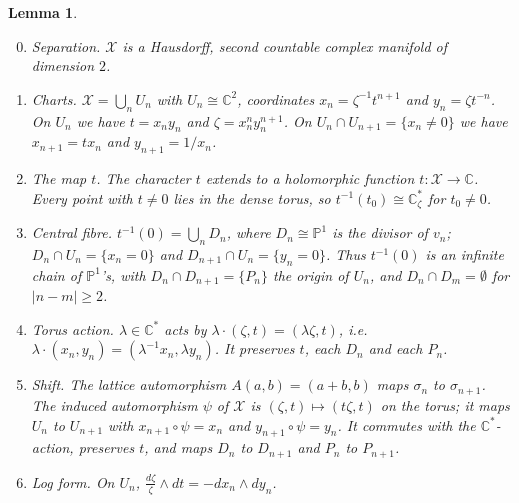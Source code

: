 \documentclass{article}
\newtheorem{lemma}[theorem]{Lemma}
\theoremstyle{definition}
\theoremstyle{plain}
\newcommand{\C}{\mathbb{C}}
\newcommand{\PP}{\mathbb{P}}
\newcommand{\cX}{\mathcal{X}}
\begin{document}
\begin{lemma}\label{lem:toric}\leavevmode
\begin{enumerate}
\setcounter{enumi}{-1}
\item \emph{Separation.} $\cX$ is a Hausdorff, second countable complex manifold of
  dimension $2$.
\item \emph{Charts.} $\cX=\bigcup_n U_n$ with $U_n\cong\C^2$, coordinates
  $x_n=\zeta^{-1}t^{n+1}$ and $y_n=\zeta t^{-n}$. On $U_n$ we have $t=x_ny_n$ and
  $\zeta=x_n^ny_n^{n+1}$. On $U_n\cap U_{n+1}=\{x_n\neq0\}$ we have $x_{n+1}=tx_n$ and
  $y_{n+1}=1/x_n$.
\item \emph{The map $t$.} The character $t$ extends to a holomorphic function
  $t\colon\cX\to\C$. Every point with $t\neq0$ lies in the dense torus, so
  $t^{-1}(t_0)\cong\C^*_\zeta$ for $t_0\ne0$.
\item \emph{Central fibre.} $t^{-1}(0)=\bigcup_n D_n$, where $D_n\cong\PP^1$ is the
  divisor of $v_n$; $D_n\cap U_n=\{x_n=0\}$ and $D_{n+1}\cap U_n=\{y_n=0\}$. Thus
  $t^{-1}(0)$ is an infinite chain of $\PP^1$'s, with $D_n\cap D_{n+1}=\{P_n\}$ the
  origin of $U_n$, and $D_n\cap D_m=\emptyset$ for $|n-m|\ge2$.
\item \emph{Torus action.} $\lambda\in\C^*$ acts by $\lambda\cdot(\zeta,t)=(\lambda\zeta,t)$,
  i.e.\ $\lambda\cdot(x_n,y_n)=(\lambda^{-1}x_n,\lambda y_n)$. It preserves $t$, each $D_n$
  and each $P_n$.
\item \emph{Shift.} The lattice automorphism $A(a,b)=(a+b,b)$ maps $\sigma_n$ to
  $\sigma_{n+1}$. The induced automorphism $\psi$ of $\cX$ is $(\zeta,t)\mapsto(t\zeta,t)$
  on the torus; it maps $U_n$ to $U_{n+1}$ with $x_{n+1}\circ\psi=x_n$ and
  $y_{n+1}\circ\psi=y_n$. It commutes with the $\C^*$-action, preserves $t$, and maps
  $D_n$ to $D_{n+1}$ and $P_n$ to $P_{n+1}$.
\item \emph{Log form.} On $U_n$, $\tfrac{d\zeta}{\zeta}\wedge dt=-dx_n\wedge dy_n$.
\end{enumerate}
\end{lemma}
\end{document}
